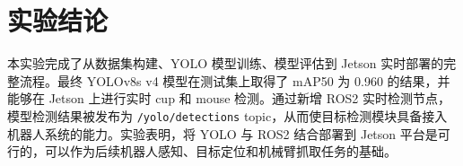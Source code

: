 \documentclass[UTF8,a4paper,12pt,fontset=fandol]{ctexart}
\begin{document}
\section{实验结论}

本实验完成了从数据集构建、YOLO 模型训练、模型评估到 Jetson 实时部署的完整流程。最终 YOLOv8s v4 模型在测试集上取得了 mAP50 为 0.960 的结果，并能够在 Jetson 上进行实时 cup 和 mouse 检测。通过新增 ROS2 实时检测节点，模型检测结果被发布为 \texttt{/yolo/detections} topic，从而使目标检测模块具备接入机器人系统的能力。实验表明，将 YOLO 与 ROS2 结合部署到 Jetson 平台是可行的，可以作为后续机器人感知、目标定位和机械臂抓取任务的基础。
\end{document}

